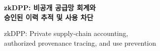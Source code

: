 \documentclass[11pt,a4paper]{article}
\begin{document}
\begin{center}{\LARGE\bfseries zkDPP: 비공개 공급망 회계와\\승인된 이력 추적 및 사용 차단}\par\medskip
    zkDPP: Private supply-chain accounting,\\authorized provenance tracing, and use prevention
\end{center}

\clearpage

\clearpage

\clearpage

\clearpage

\clearpage

\clearpage

\clearpage

\clearpage

\clearpage

\clearpage

\clearpage

\clearpage

\clearpage

\end{document}
